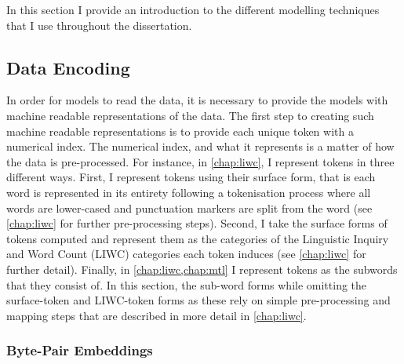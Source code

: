 In this section I provide an introduction to the different modelling techniques that I use throughout the dissertation.

\subsection{Data Encoding}

In order for models to read the data, it is necessary to provide the models with machine readable representations of the data. The first step to creating such machine readable representations is to provide each unique token with a numerical index.
The numerical index, and what it represents is a matter of how the data is pre-processed. For instance, in \cref{chap:liwc}, I represent tokens in three different ways.
First, I represent tokens using their surface form, that is each word is represented in its entirety following a tokenisation process where all words are lower-cased and punctuation markers are split from the word (see \cref{chap:liwc} for further pre-processing steps). Second, I take the surface forms of tokens computed and represent them as the categories of the Linguistic Inquiry and Word Count (LIWC) categories each token induces (see \cref{chap:liwc} for further detail). Finally, in \cref{chap:liwc,chap:mtl} I represent tokens as the subwords that they consist of. 
In this section, the sub-word forms while omitting the surface-token and LIWC-token forms as these rely on simple pre-processing and mapping steps that are described in more detail in \cref{chap:liwc}.

\subsubsection{Byte-Pair Embeddings}

